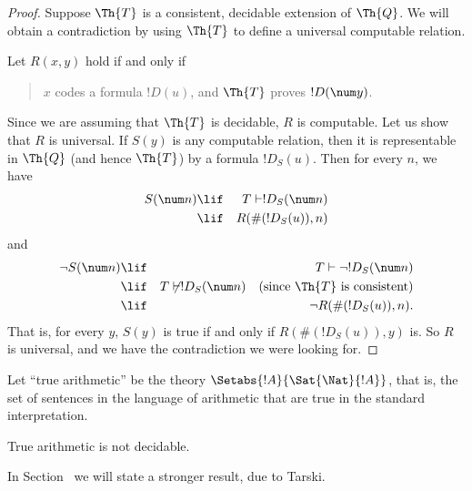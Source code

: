 \documentclass[../../include/open-logic-section]{subfiles}
\begin{document}
\begin{proof}
Suppose $\Th{T}$ is a consistent, decidable
extension of $\Th{Q}$. We will obtain a contradiction by using $\Th{T}$ to
define a universal computable relation.

Let $R(x,y)$ hold if and only if 
\begin{quote}
$x$ codes a formula $!D(u)$, and $\Th{T}$ proves $!D(\num y)$.
\end{quote}
Since we are assuming that $\Th{T}$ is decidable, $R$ is computable. Let us
show that $R$ is universal. If $S(y)$ is any computable relation, then
it is representable in $\Th{Q}$ (and hence $\Th{T}$) by a formula
$!D_S(u)$. Then for every $n$, we have
\begin{eqnarray*}
S(\num n) & \lif & T \vdash !D_S(\num n) \\
& \lif & R(\#(!D_S(u)), n)
\end{eqnarray*}
and
\begin{eqnarray*}
\lnot S(\num n) & \lif & T \vdash \lnot !D_S(\num n) \\
& \lif & T \not\vdash !D_S(\num n) \quad \text{(since $\Th{T}$ is
  consistent)} \\
& \lif & \lnot R(\#(!D_S(u)),n).
\end{eqnarray*}
That is, for every $y$, $S(y)$ is true if and only if
$R(\#(!D_S(u)),y)$ is. So $R$ is universal, and we have the
contradiction we were looking for. 
\end{proof}

Let ``true arithmetic'' be the theory $\Setabs{!A}{ \Sat{\Nat}{!A}}$,
that is, the set of sentences in the language of arithmetic that are
true in the standard interpretation.

\begin{cor}
True arithmetic is not decidable.
\end{cor}

In Section~ we will state a stronger
result, due to Tarski.
\end{document}
